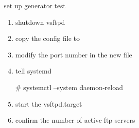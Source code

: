 \cprotect\note{
	}

\begin{frame}
	{set up generator test}

	\begin{enumerate}
	\item shutdown vsftpd 
	\item copy the config file  to 
	\item modify the port number in the new file
	\item tell systemd
		\begin{raw}
	# systemctl --system daemon-reload
		\end{raw}
	\item start the vsftpd.target 
	\item confirm the number of active ftp servers
	\end{enumerate}

\end{frame} 

\cprotect\note{

	}





